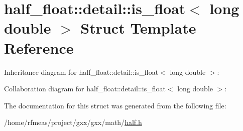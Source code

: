 \hypertarget{structhalf__float_1_1detail_1_1is__float_3_01long_01double_01_4}{}\section{half\+\_\+float\+:\+:detail\+:\+:is\+\_\+float$<$ long double $>$ Struct Template Reference}
\label{structhalf__float_1_1detail_1_1is__float_3_01long_01double_01_4}


Inheritance diagram for half\+\_\+float\+:\+:detail\+:\+:is\+\_\+float$<$ long double $>$\+:


Collaboration diagram for half\+\_\+float\+:\+:detail\+:\+:is\+\_\+float$<$ long double $>$\+:


The documentation for this struct was generated from the following file\+:\begin{DoxyCompactItemize}
\item 
/home/rfmeas/project/gxx/gxx/math/\hyperlink{half_8h}{half.\+h}\end{DoxyCompactItemize}
